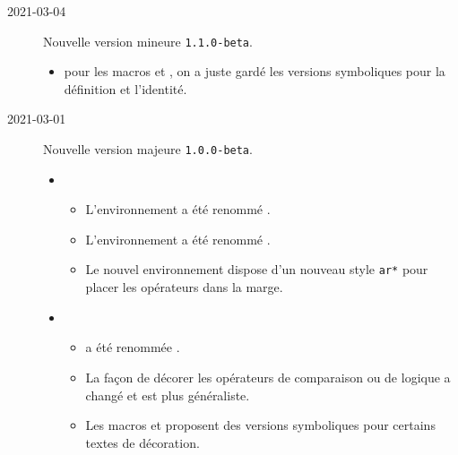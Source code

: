 \documentclass[12pt,a4paper]{article}
\begin{document}
\begin{description}
    
    \separation


    \medskip
    \item[2021-03-04] Nouvelle version mineure \verb+1.1.0-beta+.
    
    \begin{itemize}[itemsep=.5em]
        \item {}
              pour les macros  et , on a juste gardé les versions symboliques pour la définition et l'identité.
    \end{itemize}
    
    
    \separation


    \medskip
    \item[2021-03-01] Nouvelle version majeure \verb+1.0.0-beta+.
    
    \begin{itemize}[itemsep=.5em]
        \item {}
        \begin{itemize}[itemsep=.5em]
            \item L'environnement  a été renommé .
    
            \item L'environnement  a été renommé .
    
            \item Le nouvel environnement  dispose d'un nouveau style \verb#ar*# pour placer les opérateurs dans la marge.
        \end{itemize}
    
    
        \item {}
        \begin{itemize}[itemsep=.5em]
            \item {} a été renommée .
    
            \item La façon de décorer les opérateurs de comparaison ou de logique a changé et est plus généraliste.
    
            \item Les macros  et  proposent des versions symboliques pour certains textes de décoration.
        \end{itemize}
    \end{itemize}
    

\end{description}
\end{document}
